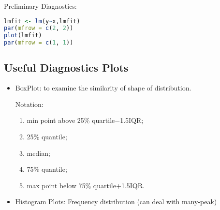     \noindent Preliminary Diagnostics:

\begin{rcode}
\begin{lstlisting}[language=R]
lmfit <- lm(y~x,lmfit)
par(mfrow = c(2, 2))
plot(lmfit)
par(mfrow = c(1, 1))
\end{lstlisting}
\end{rcode}
    

\subsection{Useful Diagnostics Plots}

        \begin{itemize}[topsep=2pt,itemsep=2pt]
            \item BoxPlot: to examine the similarity of shape of distribution.
            
            Notation:
            \begin{enumerate}[topsep=2pt,itemsep=2pt]
                \item min point above 25\% quartile$ - $1.5IQR;
                \item 25\% quantile;
                \item median;
                \item 75\% quantile;
                \item max point below 75\% quartile$ + $1.5IQR.
            \end{enumerate}
            
                
            \begin{center}
            \end{center}


    
            

        \item Histogram Plots: Frequency distribution (can deal with many-peak)
            

\end{itemize}
